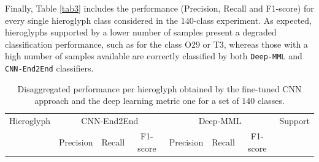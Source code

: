 \documentclass[10pt,onecolumn,letterpaper]{article}
\newcommand{\method}[1]{\texttt{#1}}
\begin{document}
Finally, Table \ref{tab3} includes the performance (Precision, Recall and F1-score) for every single hieroglyph class considered in the $140$-class experiment. As expected, hieroglyphs supported by a lower number of samples present a degraded classification performance, such as for the class O29 or T3, whereas those with a high number of samples available are correctly classified by both \method{Deep-MML} and \method{CNN-End2End} classifiers.

	\footnotesize
	\begin{longtable}{|c|c|c|c|c|c|c|c|}
		\caption{Disaggregated performance per hieroglyph obtained by the fine-tuned CNN approach and the deep learning metric one for a set of $140$ classes.} \\
		\hline
		Hieroglyph & \multicolumn{3}{c|}{CNN-End2End} & \multicolumn{3}{c|}{Deep-MML} & Support \\
		& Precision & Recall & F1-score  & Precision& Recall&F1-score&  \\
		\hline
		\endfirsthead
		

\end{longtable}
\end{document}
